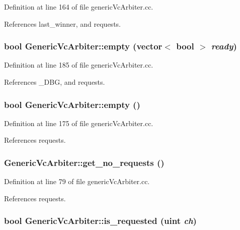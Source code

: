 Definition at line 164 of file genericVcArbiter.cc.

References last\_\-winner, and requests.
\subsubsection[{empty}]{\setlength{\rightskip}{0pt plus 5cm}bool GenericVcArbiter::empty (vector$<$ bool $>$ {\em ready})}\label{classGenericVcArbiter_89fe4818dbc079a5305db9cfe23fd5a3}




Definition at line 185 of file genericVcArbiter.cc.

References \_\-DBG, and requests.
\subsubsection[{empty}]{\setlength{\rightskip}{0pt plus 5cm}bool GenericVcArbiter::empty ()}\label{classGenericVcArbiter_c03a3978b5564acfd561a097384570d5}




Definition at line 175 of file genericVcArbiter.cc.

References requests.
\subsubsection[{get\_\-no\_\-requests}]{ GenericVcArbiter::get\_\-no\_\-requests ()}\label{classGenericVcArbiter_0648f3756140fa6acc1e9345015b3461}




Definition at line 79 of file genericVcArbiter.cc.

References requests.
\subsubsection[{is\_\-requested}]{\setlength{\rightskip}{0pt plus 5cm}bool GenericVcArbiter::is\_\-requested ({\bf uint} {\em ch})}\label{classGenericVcArbiter_bea0f63a51a1bfbfe7bd3a3ee0b95b48}




